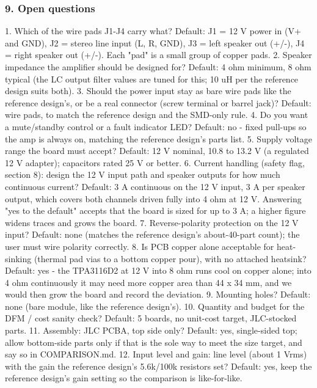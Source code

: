 \documentclass[11pt]{article}
\begin{document}
\subsubsection*{9. Open questions}
1. Which of the wire pads J1-J4 carry what? Default: J1 = 12 V power in (V+ and GND), J2 = stereo line input (L, R, GND), J3 = left speaker out (+/-), J4 = right speaker out (+/-). Each "pad" is a small group of copper pads. 2. Speaker impedance the amplifier should be designed for? Default: 4 ohm minimum, 8 ohm typical (the LC output filter values are tuned for this; 10 uH per the reference design suits both). 3. Should the power input stay as bare wire pads like the reference design's, or be a real connector (screw terminal or barrel jack)? Default: wire pads, to match the reference design and the SMD-only rule. 4. Do you want a mute/standby control or a fault indicator LED? Default: no - fixed pull-ups so the amp is always on, matching the reference design's parts list. 5. Supply voltage range the board must accept? Default: 12 V nominal, 10.8 to 13.2 V (a regulated 12 V adapter); capacitors rated 25 V or better. 6. Current handling (safety flag, section 8): design the 12 V input path and speaker outputs for how much continuous current? Default: 3 A continuous on the 12 V input, 3 A per speaker output, which covers both channels driven fully into 4 ohm at 12 V. Answering "yes to the default" accepts that the board is sized for up to 3 A; a higher figure widens traces and grows the board. 7. Reverse-polarity protection on the 12 V input? Default: none (matches the reference design's about-40-part count); the user must wire polarity correctly. 8. Is PCB copper alone acceptable for heat-sinking (thermal pad vias to a bottom copper pour), with no attached heatsink? Default: yes - the TPA3116D2 at 12 V into 8 ohm runs cool on copper alone; into 4 ohm continuously it may need more copper area than 44 x 34 mm, and we would then grow the board and record the deviation. 9. Mounting holes? Default: none (bare module, like the reference design's). 10. Quantity and budget for the DFM / cost sanity check? Default: 5 boards, no unit-cost target, JLC-stocked parts. 11. Assembly: JLC PCBA, top side only? Default: yes, single-sided top; allow bottom-side parts only if that is the sole way to meet the size target, and say so in COMPARISON.md. 12. Input level and gain: line level (about 1 Vrms) with the gain the reference design's 5.6k/100k resistors set? Default: yes, keep the reference design's gain setting so the comparison is like-for-like.
\end{document}
